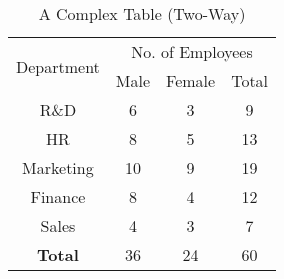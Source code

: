 \documentclass[
10pt, %
a4paper, %
]{report}
\begin{document}
\begin{table}[] %
\begin{center}
\begin{tabular}{|cl|ccc|}
\hline
\multicolumn{2}{|c|}{\multirow{2}{*}{Department}} & \multicolumn{3}{c|}{No. of Employees}                           \\ \cline{3-5} 
\multicolumn{2}{|c|}{}                            & \multicolumn{1}{c|}{Male} & \multicolumn{1}{c|}{Female} & Total \\ \hline \hline
\multicolumn{2}{|c|}{R\&D}                        & \multicolumn{1}{c|}{6}    & \multicolumn{1}{c|}{3}      & 9     \\ \hline
\multicolumn{2}{|c|}{HR}                          & \multicolumn{1}{c|}{8}    & \multicolumn{1}{c|}{5}      & 13    \\ \hline
\multicolumn{2}{|c|}{Marketing}                   & \multicolumn{1}{c|}{10}   & \multicolumn{1}{c|}{9}      & 19    \\ \hline
\multicolumn{2}{|c|}{Finance}                     & \multicolumn{1}{c|}{8}    & \multicolumn{1}{c|}{4}      & 12    \\ \hline
\multicolumn{2}{|c|}{Sales}                       & \multicolumn{1}{c|}{4}    & \multicolumn{1}{c|}{3}      & 7     \\ \hline \hline
\multicolumn{2}{|c|}{\textbf{Total}}              & \multicolumn{1}{c|}{36}   & \multicolumn{1}{c|}{24}     & 60    \\ \hline
\end{tabular}
\end{center}
\caption{A Complex Table (Two-Way)}
\label{tab:complex_twoway}
\end{table}
\end{document}
